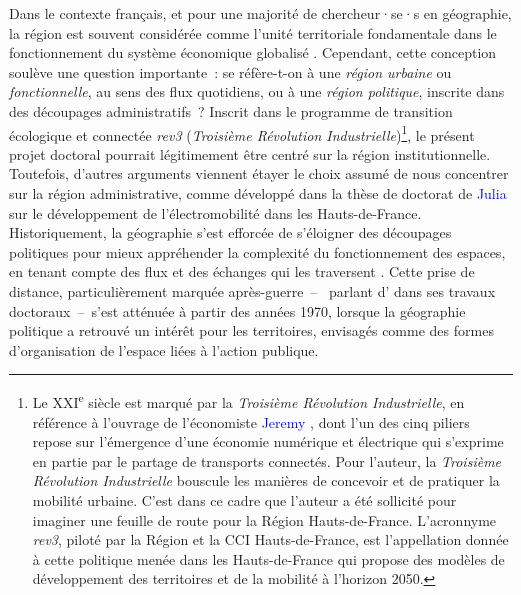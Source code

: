 \begin{refsegment}
Dans le contexte français, et pour une majorité de chercheur·se·s en géographie, la région est souvent considérée comme l'unité territoriale fondamentale dans le fonctionnement du système économique globalisé \textcolor{blue}{\autocite[]{calthorpe_regional_2001}}. Cependant, cette conception soulève une question importante~: se réfère-t-on à une \textsl{région urbaine} ou \textsl{fonctionnelle}, au sens des flux quotidiens, ou à une \textsl{région politique}, inscrite dans des découpages administratifs~? Inscrit dans le programme de transition écologique et connectée \textsl{rev3} (\textsl{Troisième Révolution Industrielle})\footnote{
    Le XXI\textsuperscript{e} siècle est marqué par la \textsl{Troisième Révolution Industrielle}, en référence à l'ouvrage de l'économiste \textcolor{blue}{Jeremy} \textcolor{blue}{\textcite[338]{rifkin_troisieme_2012}}, dont l'un des cinq piliers repose sur l'émergence d'une économie numérique et électrique qui s'exprime en partie par le partage de transports connectés. Pour l'auteur, la \textsl{Troisième Révolution Industrielle} bouscule les manières de concevoir et de pratiquer la mobilité urbaine. C'est dans ce cadre que l'auteur a été sollicité pour imaginer une feuille de route pour la Région Hauts-de-France. L'acronnyme \textsl{rev3}, piloté par la Région et la \acrfull{CCI} Hauts-de-France, est l'appellation donnée à cette politique menée dans les Hauts-de-France qui propose des modèles de développement des territoires et de la mobilité à l'horizon 2050.
}, le présent projet doctoral pourrait légitimement être centré sur la région institutionnelle. Toutefois, d'autres arguments viennent étayer le choix assumé de nous concentrer sur la région administrative, comme développé dans la thèse de doctorat de \textcolor{blue}{Julia} \textcolor{blue}{\textcite[166]{frotey_acteurs_2021}} sur le développement de l'électromobilité dans les Hauts-de-France. Historiquement, la géographie s'est efforcée de s'éloigner des découpages politiques pour mieux appréhender la complexité du fonctionnement des espaces, en tenant compte des flux et des échanges qui les traversent \textcolor{blue}{\autocite[]{pumain_regionalisation_2016}}. Cette prise de distance, particulièrement marquée après-guerre~–~\textcolor{blue}{\textcite[16-18]{menerault_reseaux_1991}} parlant d' dans ses travaux doctoraux~–~s'est atténuée à partir des années 1970, lorsque la géographie politique a retrouvé un intérêt pour les territoires, envisagés comme des formes d'organisation de l'espace liées à l'action publique.%


\end{refsegment}

